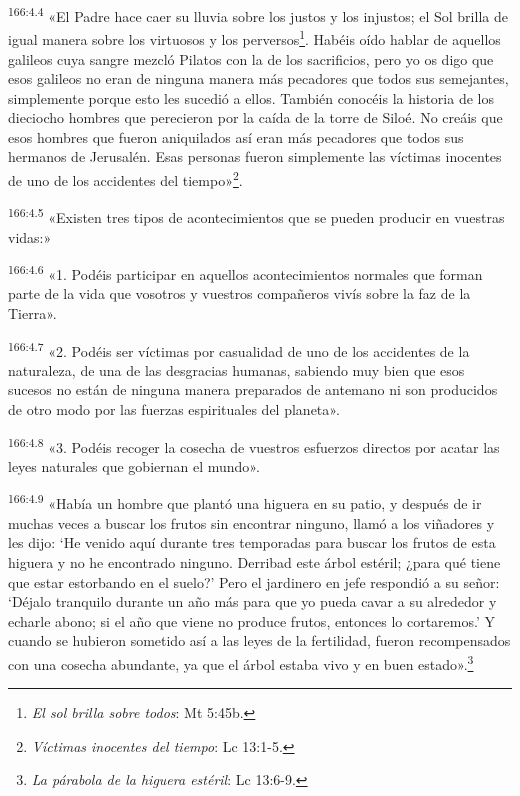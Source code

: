 \par
\textsuperscript{166:4.4} «El Padre hace caer su lluvia sobre los justos y los injustos; el Sol brilla de igual manera sobre los virtuosos y los perversos\footnote{\textit{El sol brilla sobre todos}: Mt 5:45b.}. Habéis oído hablar de aquellos galileos cuya sangre mezcló Pilatos con la de los sacrificios, pero yo os digo que esos galileos no eran de ninguna manera más pecadores que todos sus semejantes, simplemente porque esto les sucedió a ellos. También conocéis la historia de los dieciocho hombres que perecieron por la caída de la torre de Siloé. No creáis que esos hombres que fueron aniquilados así eran más pecadores que todos sus hermanos de Jerusalén. Esas personas fueron simplemente las víctimas inocentes de uno de los accidentes del tiempo»\footnote{\textit{Víctimas inocentes del tiempo}: Lc 13:1-5.}.

\par
\textsuperscript{166:4.5} «Existen tres tipos de acontecimientos que se pueden producir en vuestras vidas:»

\par
\textsuperscript{166:4.6} «1. Podéis participar en aquellos acontecimientos normales que forman parte de la vida que vosotros y vuestros compañeros vivís sobre la faz de la Tierra».

\par
\textsuperscript{166:4.7} «2. Podéis ser víctimas por casualidad de uno de los accidentes de la naturaleza, de una de las desgracias humanas, sabiendo muy bien que esos sucesos no están de ninguna manera preparados de antemano ni son producidos de otro modo por las fuerzas espirituales del planeta».

\par
\textsuperscript{166:4.8} «3. Podéis recoger la cosecha de vuestros esfuerzos directos por acatar las leyes naturales que gobiernan el mundo».

\par
\textsuperscript{166:4.9} «Había un hombre que plantó una higuera en su patio, y después de ir muchas veces a buscar los frutos sin encontrar ninguno, llamó a los viñadores y les dijo: `He venido aquí durante tres temporadas para buscar los frutos de esta higuera y no he encontrado ninguno. Derribad este árbol estéril; ¿para qué tiene que estar estorbando en el suelo?' Pero el jardinero en jefe respondió a su señor: `Déjalo tranquilo durante un año más para que yo pueda cavar a su alrededor y echarle abono; si el año que viene no produce frutos, entonces lo cortaremos.' Y cuando se hubieron sometido así a las leyes de la fertilidad, fueron recompensados con una cosecha abundante, ya que el árbol estaba vivo y en buen estado».\footnote{\textit{La párabola de la higuera estéril}: Lc 13:6-9.}

